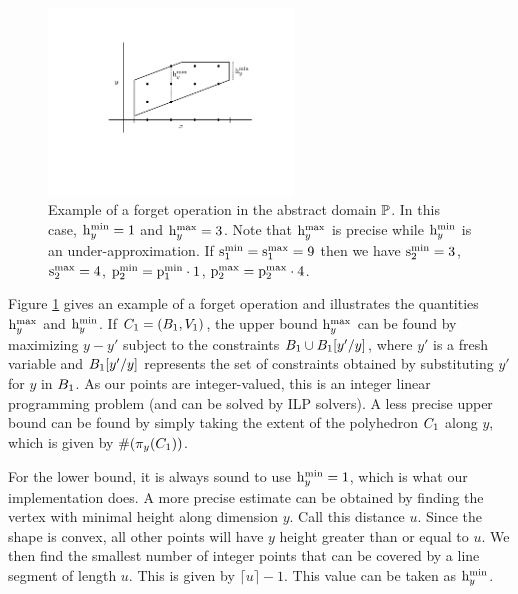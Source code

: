 \begin{figure}
\begin{center}
\includegraphics[width=6.5cm]{figures/forget.pdf} %
\end{center}
\caption{\label{fig:forget} Example of a forget operation in the abstract domain $\mathbb{P}$.  In this case, $\mathrm{h}^\mathrm{min}_{y} = 1$ and $\mathrm{h}^\mathrm{max}_{y} = 3$.  Note that $\mathrm{h}^\mathrm{max}_{y}$ is precise while $\mathrm{h}^\mathrm{min}_{y}$ is an under-approximation.  If $\mathrm{s}^\mathrm{min}_{1} = \mathrm{s}^\mathrm{max}_{1} = 9$ then we have $\mathrm{s}^\mathrm{min}_{2} = 3$, $\mathrm{s}^\mathrm{max}_{2} = 4$, $\mathrm{p}^\mathrm{min}_{2} = \mathrm{p}^\mathrm{min}_{1} \cdot 1$, $\mathrm{p}^\mathrm{max}_{2} = \mathrm{p}^\mathrm{max}_{2} \cdot 4$.}
\end{figure}

Figure \ref{fig:forget} gives an example of a forget operation and
illustrates the quantities $\mathrm{h}^\mathrm{max}_{y}$ and $\mathrm{h}^\mathrm{min}_{y}$.  If $ C_1 =
(B_1, V_1) $, the upper bound $\mathrm{h}^\mathrm{max}_{y}$ can be found by maximizing $y - y'$ subject to the
constraints $B_1 \cup B_1[y' / y]$, where $y'$ is a fresh variable and $B_1[y'/y]$ represents the set of
constraints obtained by substituting $y'$ for $y$ in $B_1$.  As our
points are integer-valued, this is an integer linear programming
problem (and can be solved by ILP solvers).  A less precise upper bound
can be found by simply taking the extent of the polyhedron $C_{1}$ along $y$,
which is given by $\#(\pi_y(C_{1}))$.

For the lower bound, it is always sound to use $\mathrm{h}^\mathrm{min}_{y} = 1$, which is what our implementation does.  A more precise estimate can be obtained by finding the vertex with minimal height along dimension $y$.  Call this distance $u$.  Since the shape is convex, all other points will have $y$ height greater than or equal to $u$.  We then find the smallest number of integer points that can be covered by a line segment of length $u$.  This is given by $\lceil u \rceil - 1$.  This value can be taken as $\mathrm{h}^\mathrm{min}_{y}$.

